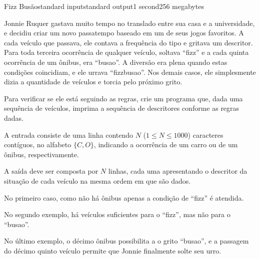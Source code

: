 \begin{problem}{Fizz Busão}{standard input}{standard output}{1 second}{256 megabytes}

Jonnie Ruquer gastava muito tempo no translado entre sua casa e a universidade, e decidiu criar um novo passatempo baseado em um de seus jogos favoritos. A cada veículo que passava, ele contava a frequência do tipo e gritava um descritor. Para toda terceira ocorrência de qualquer veículo, soltava ``fizz'' e a cada quinta ocorrência de um ônibus, era ``busao''. A diversão era plena quando estas condições coincidiam, e ele urrava ``fizzbusao''. Nos demais casos, ele simplesmente dizia a quantidade de veículos e torcia pelo próximo grito. 

Para verificar se ele está seguindo as regras, crie um programa que, dada uma sequência de veículos, imprima a sequência de descritores conforme as regras dadas.

\InputFile
A entrada consiste de uma linha contendo $N$ ($1 \leq N \leq 1000$) caracteres contíguos, no alfabeto $\{C, O\}$, indicando a ocorrência de um carro ou de um ônibus, respectivamente.

\OutputFile
A saída deve ser composta por $N$ linhas, cada uma apresentando o descritor da situação de cada veículo na mesma ordem em que são dados.

\Examples

\begin{example}
%
%
%
\end{example}

\Note
No primeiro caso, como não há ônibus apenas a condição de ``fizz'' é atendida.

No segundo exemplo, há veículos suficientes para o ``fizz'', mas não para o ``busao''.

No último exemplo, o décimo ônibus possibilita a o grito ``busao'', e a passagem do décimo quinto veículo permite que Jonnie finalmente solte seu urro.

\end{problem}


